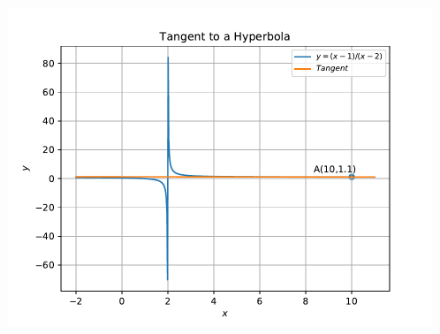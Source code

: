 \documentclass[12pt]{article}
\begin{document}
\begin{enumerate}
\begin{figure}[!h]
\begin{center}
		\includegraphics[width=\columnwidth]{figs/problem2.pdf}
	\end{center}
\caption{}
\label{fig:Fig1}
\end{figure}
\end{enumerate}
\end{document}
